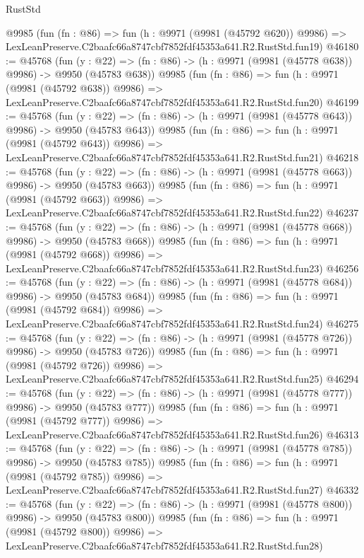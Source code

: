 \begin{lexlean}{RustStd}
\begin{coremodule}
    @9985
    (fun (fn : @86) =>
    fun (h : @9971 (@9981 (@45792 @620)) @9986) =>
    LexLeanPreserve.C2baafc66a8747cbf7852fdf45353a641.R2.RustStd.fun19)
@46180 := @45768
    (fun (y : @22) => (fn : @86) -> (h : @9971 (@9981 (@45778 @638)) @9986) -> @9950 (@45783 @638))
    @9985
    (fun (fn : @86) =>
    fun (h : @9971 (@9981 (@45792 @638)) @9986) =>
    LexLeanPreserve.C2baafc66a8747cbf7852fdf45353a641.R2.RustStd.fun20)
@46199 := @45768
    (fun (y : @22) => (fn : @86) -> (h : @9971 (@9981 (@45778 @643)) @9986) -> @9950 (@45783 @643))
    @9985
    (fun (fn : @86) =>
    fun (h : @9971 (@9981 (@45792 @643)) @9986) =>
    LexLeanPreserve.C2baafc66a8747cbf7852fdf45353a641.R2.RustStd.fun21)
@46218 := @45768
    (fun (y : @22) => (fn : @86) -> (h : @9971 (@9981 (@45778 @663)) @9986) -> @9950 (@45783 @663))
    @9985
    (fun (fn : @86) =>
    fun (h : @9971 (@9981 (@45792 @663)) @9986) =>
    LexLeanPreserve.C2baafc66a8747cbf7852fdf45353a641.R2.RustStd.fun22)
@46237 := @45768
    (fun (y : @22) => (fn : @86) -> (h : @9971 (@9981 (@45778 @668)) @9986) -> @9950 (@45783 @668))
    @9985
    (fun (fn : @86) =>
    fun (h : @9971 (@9981 (@45792 @668)) @9986) =>
    LexLeanPreserve.C2baafc66a8747cbf7852fdf45353a641.R2.RustStd.fun23)
@46256 := @45768
    (fun (y : @22) => (fn : @86) -> (h : @9971 (@9981 (@45778 @684)) @9986) -> @9950 (@45783 @684))
    @9985
    (fun (fn : @86) =>
    fun (h : @9971 (@9981 (@45792 @684)) @9986) =>
    LexLeanPreserve.C2baafc66a8747cbf7852fdf45353a641.R2.RustStd.fun24)
@46275 := @45768
    (fun (y : @22) => (fn : @86) -> (h : @9971 (@9981 (@45778 @726)) @9986) -> @9950 (@45783 @726))
    @9985
    (fun (fn : @86) =>
    fun (h : @9971 (@9981 (@45792 @726)) @9986) =>
    LexLeanPreserve.C2baafc66a8747cbf7852fdf45353a641.R2.RustStd.fun25)
@46294 := @45768
    (fun (y : @22) => (fn : @86) -> (h : @9971 (@9981 (@45778 @777)) @9986) -> @9950 (@45783 @777))
    @9985
    (fun (fn : @86) =>
    fun (h : @9971 (@9981 (@45792 @777)) @9986) =>
    LexLeanPreserve.C2baafc66a8747cbf7852fdf45353a641.R2.RustStd.fun26)
@46313 := @45768
    (fun (y : @22) => (fn : @86) -> (h : @9971 (@9981 (@45778 @785)) @9986) -> @9950 (@45783 @785))
    @9985
    (fun (fn : @86) =>
    fun (h : @9971 (@9981 (@45792 @785)) @9986) =>
    LexLeanPreserve.C2baafc66a8747cbf7852fdf45353a641.R2.RustStd.fun27)
@46332 := @45768
    (fun (y : @22) => (fn : @86) -> (h : @9971 (@9981 (@45778 @800)) @9986) -> @9950 (@45783 @800))
    @9985
    (fun (fn : @86) =>
    fun (h : @9971 (@9981 (@45792 @800)) @9986) =>
    LexLeanPreserve.C2baafc66a8747cbf7852fdf45353a641.R2.RustStd.fun28)

\end{coremodule}
\end{lexlean}
